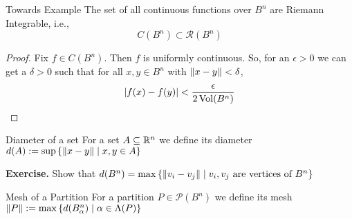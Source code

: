 \documentclass[../Analysis-3.tex]{subfiles}
\begin{document}
\begin{Thm}{Towards Example}{}
  The set of all continuous functions over $ B^n $ are Riemann Integrable, i.e.,
  \[  C(B^n) \subset \mathscr{R}(B^n)   \]
\end{Thm}

\begin{proof}
  Fix $ f \in C(B^n) $. Then $ f $ is uniformly continuous. So, for an $ \epsilon > 0 $ we can get a $ \delta > 0 $ such that for all $ x, y \in B^n $ with $ \norm{x-y} < \delta $,
  \[  \abs{f(x) - f(y)} < \frac{\epsilon}{2\operatorname{Vol}(B^n)}  \]
\end{proof}

\begin{Def}{Diameter of a set}{}
  For a set $ A \subseteq \mathbb{R}^n $ we define its diameter $ d(A) := \sup\left\{ \norm{x-y} \mid x,y \in A \right\} $
\end{Def}

\textbf{Exercise.} Show that $ d(B^n) = \max\left\{ \norm{v_i-v_j} \mid v_i, v_j \text{ are vertices of } B^n \right\} $

\begin{Def}{Mesh of a Partition}{}
  For a partition $ P \in \mathscr{P}(B^n) $ we define its mesh $ \norm{P} := \max\left\{ d(B_{\alpha}^n) \mid \alpha \in \Lambda(P) \right\} $
\end{Def}
\end{document}

